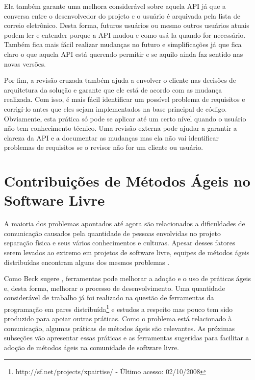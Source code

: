 Ela também garante uma melhora considerável sobre aquela API já que a
conversa entre o desenvolvedor do projeto e o usuário é arquivada pela
lista de correio eletrônico. Desta forma, futuros usuários ou mesmo
outros usuários atuais podem ler e entender porque a API mudou e como
usá-la quando for necessário. Também fica mais fácil realizar mudanças
no futuro e simplificações já que fica claro o que aquela API está
querendo permitir e se aquilo ainda faz sentido nas novas versões.

Por fim, a revisão cruzada também ajuda a envolver o cliente nas
decisões de arquitetura da solução e garante que ele está de acordo
com as mudança realizada. Com isso, é mais fácil identificar um
possível problema de requisitos e corrigí-lo antes que eles sejam
implementados na base principal de código. Obviamente, esta prática só
pode se aplicar até um certo nível quando o usuário não tem
conhecimento técnico. Uma revisão externa pode ajudar a garantir a
clareza da API e a documentar as mudanças mas ela não vai identificar
problemas de requisitos se o revisor não for um cliente ou usuário.

\section{Contribuições de Métodos Ágeis no Software Livre}
\label{sec:agile-improve-os}

A maioria dos problemas apontados até agora são relacionados a
dificuldades de comunicação causados pela quantidade de pessoas
envolvidas no projeto separação física e seus vários conhecimentos e
culturas. Apesar desses fatores serem levados ao extremo em projetos
de software livre, equipes de métodos ágeis distribuídas encontram
alguns dos mesmos problemas \cite{Sutherland2007,Maurer2002}.

Como Beck sugere \cite{Beck2008}, ferramentas pode melhorar a adoção e
o uso de práticas ágeis e, desta forma, melhorar o processo de
desenvolvimento. Uma quantidade considerável de trabalho já foi
realizado na questão de ferramentas da programação em pares
distribuída\footnote{http://sf.net/projects/xpairtise/ - Último acesso:
  02/10/2008} e estudos a respeito \cite{Nagappan2003} mas pouco tem
sido produzido para apoiar outras práticas. Como o problema está
relacionado à comunicação, algumas práticas de métodos ágeis são
relevantes. As próximas subseções vão apresentar essas práticas e as
ferramentas sugeridas para facilitar a adoção de métodos ágeis na
comunidade de software livre.

